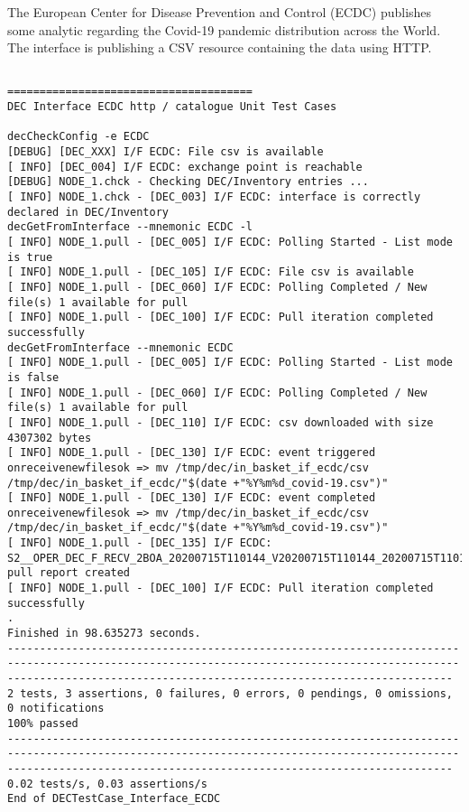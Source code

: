\documentclass[dec_sum_main.tex]{subfiles}
\begin{document}
The European Center for Disease Prevention and Control (ECDC) publishes some analytic regarding the Covid-19 pandemic distribution across the World. The interface is publishing  a CSV resource containing the data using HTTP.\newline  


	
 \newline

\begin{Verbatim}[fontsize=\tiny]

======================================
DEC Interface ECDC http / catalogue Unit Test Cases
	
decCheckConfig -e ECDC
[DEBUG] [DEC_XXX] I/F ECDC: File csv is available
[ INFO] [DEC_004] I/F ECDC: exchange point is reachable 
[DEBUG] NODE_1.chck - Checking DEC/Inventory entries ...
[ INFO] NODE_1.chck - [DEC_003] I/F ECDC: interface is correctly declared in DEC/Inventory 
decGetFromInterface --mnemonic ECDC -l
[ INFO] NODE_1.pull - [DEC_005] I/F ECDC: Polling Started - List mode is true
[ INFO] NODE_1.pull - [DEC_105] I/F ECDC: File csv is available
[ INFO] NODE_1.pull - [DEC_060] I/F ECDC: Polling Completed / New file(s) 1 available for pull
[ INFO] NODE_1.pull - [DEC_100] I/F ECDC: Pull iteration completed successfully
decGetFromInterface --mnemonic ECDC
[ INFO] NODE_1.pull - [DEC_005] I/F ECDC: Polling Started - List mode is false
[ INFO] NODE_1.pull - [DEC_060] I/F ECDC: Polling Completed / New file(s) 1 available for pull
[ INFO] NODE_1.pull - [DEC_110] I/F ECDC: csv downloaded with size 4307302 bytes
[ INFO] NODE_1.pull - [DEC_130] I/F ECDC: event triggered onreceivenewfilesok => mv /tmp/dec/in_basket_if_ecdc/csv /tmp/dec/in_basket_if_ecdc/"$(date +"%Y%m%d_covid-19.csv")"
[ INFO] NODE_1.pull - [DEC_130] I/F ECDC: event completed onreceivenewfilesok => mv /tmp/dec/in_basket_if_ecdc/csv /tmp/dec/in_basket_if_ecdc/"$(date +"%Y%m%d_covid-19.csv")"
[ INFO] NODE_1.pull - [DEC_135] I/F ECDC: S2__OPER_DEC_F_RECV_2BOA_20200715T110144_V20200715T110144_20200715T110144_ECDC.xml pull report created
[ INFO] NODE_1.pull - [DEC_100] I/F ECDC: Pull iteration completed successfully
.
Finished in 98.635273 seconds.
-----------------------------------------------------------------------------------------------------------------------------------------------------------------------------------------------------------------
2 tests, 3 assertions, 0 failures, 0 errors, 0 pendings, 0 omissions, 0 notifications
100% passed
-----------------------------------------------------------------------------------------------------------------------------------------------------------------------------------------------------------------
0.02 tests/s, 0.03 assertions/s
End of DECTestCase_Interface_ECDC

\end{Verbatim}
\end{document}

